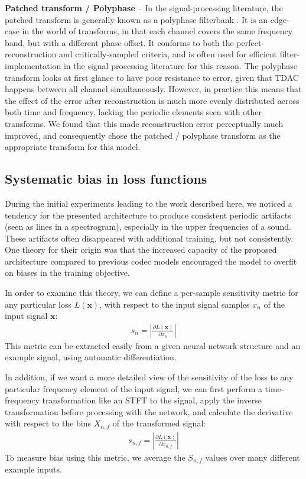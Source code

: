 \documentclass{article} %
\begin{document}
\textbf{Patched transform / Polyphase} \---
In the signal-processing literature, the patched transform is generally known as a polyphase filterbank \citep{jos}. It is an edge-case in the world of transforms, in that each channel covers the same frequency band, but with a different phase offset. It conforms to both the perfect-reconstruction and critically-sampled criteria, and is often used for efficient filter-implementation in the signal processing literature for this reason. The polyphase transform looks at first glance to have poor resistance to error, given that TDAC happens between all channel simultaneously. However, in practice this means that the effect of the error after reconstruction is much more evenly distributed across both time and frequency, lacking the periodic elements seen with other transforms. We found that this made reconstruction error perceptually much improved, and consequently chose the patched / polyphase transform as the appropriate transform for this model.

\subsection{Systematic bias in loss functions}
\label{app:discriminator}
During the initial experiments leading to the work described here, we noticed a tendency for the presented architecture to produce consistent periodic artifacts (seen as lines in a spectrogram), especially in the upper frequencies of a sound. These artifacts often disappeared with additional training, but not consistently. One theory for their origin was that the increased capacity of the proposed architecture compared to previous codec models encouraged the model to overfit on biases in the training objective.

In order to examine this theory, we can define a per-sample sensitivity metric for any particular loss $\textit{L}(\mathbf{x})$, with respect to the input signal samples $x_n$ of the input signal $\mathbf{x}$:
\begin{align}
s_n = \left|\frac{\partial \textit{L}(\mathbf{x})}{\partial x_n}\right|
\end{align}
This metric can be extracted easily from a given neural network structure and an example signal, using automatic differentiation.

In addition, if we want a more detailed view of the sensitivity of the loss to any particular frequency element of the input signal, we can first perform a time-frequency transformation like an STFT to the signal, apply the inverse transformation before processing with the network, and calculate the derivative with respect to the bins $X_{n,f}$ of the transformed signal:
\begin{align}
s_{n,f} = \left|\frac{\partial \textit{L}(\mathbf{x})}{\partial x_{n,f}}\right|
\end{align}
To measure bias using this metric, we average the $S_{n,f}$ values over many different example inputs.
\end{document}
